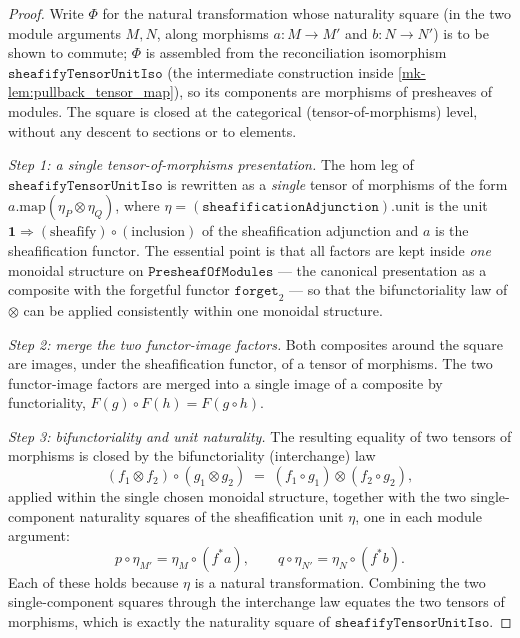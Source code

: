 \begin{proof}
  \leanok
  Write \(\Phi\) for the natural transformation whose naturality square (in the two module
  arguments \(M, N\), along morphisms \(a : M \to M'\) and \(b : N \to N'\)) is to be shown
  to commute; \(\Phi\) is assembled from the reconciliation isomorphism
  \(\mathtt{sheafifyTensorUnitIso}\) (the intermediate construction inside
  \ref{mk-lem:pullback_tensor_map}), so its components are morphisms of presheaves of modules.
  The square is closed at the categorical (tensor-of-morphisms) level, without any descent to
  sections or to elements.

  \emph{Step 1: a single tensor-of-morphisms presentation.} The \(\mathrm{hom}\) leg of
  \(\mathtt{sheafifyTensorUnitIso}\) is rewritten as a \emph{single} tensor of morphisms of the
  form \(a.\mathrm{map}(\eta_P \otimes \eta_Q)\), where
  \(\eta = (\mathtt{sheafificationAdjunction}).\mathrm{unit}\) is the unit
  \(\mathbf{1} \Rightarrow (\text{sheafify}) \circ (\text{inclusion})\) of the sheafification
  adjunction and \(a\) is the sheafification functor. The essential point is that all factors
  are kept inside \emph{one} monoidal structure on \(\mathtt{PresheafOfModules}\) --- the
  canonical presentation as a composite with the forgetful functor \(\mathtt{forget}_2\) ---
  so that the bifunctoriality law of \(\otimes\) can be applied consistently within one
  monoidal structure.

  \emph{Step 2: merge the two functor-image factors.} Both composites around the square are
  images, under the sheafification functor, of a tensor of morphisms. The two functor-image
  factors are merged into a single image of a composite by functoriality,
  \(F(g) \circ F(h) = F(g \circ h)\).

  \emph{Step 3: bifunctoriality and unit naturality.} The resulting equality of two tensors of
  morphisms is closed by the bifunctoriality (interchange) law
  \[
    (f_1 \otimes f_2) \circ (g_1 \otimes g_2) \;=\; (f_1 \circ g_1) \otimes (f_2 \circ g_2),
  \]
  applied within the single chosen monoidal structure, together with the two
  single-component naturality squares of the sheafification unit \(\eta\), one in each module
  argument:
  \[
    p \circ \eta_{M'} = \eta_{M} \circ (f^*a),
    \qquad
    q \circ \eta_{N'} = \eta_{N} \circ (f^*b).
  \]
  Each of these holds because \(\eta\) is a natural transformation. Combining the two
  single-component squares through the interchange law equates the two tensors of morphisms,
  which is exactly the naturality square of \(\mathtt{sheafifyTensorUnitIso}\).
\end{proof}

